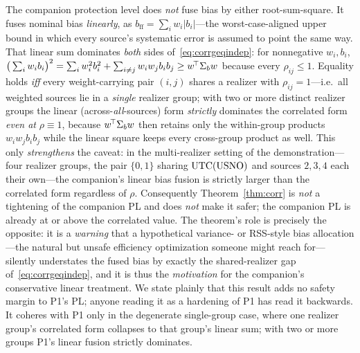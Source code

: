 \begin{remark}
\label{rem:i3}
The companion protection level \citep{baweja2026cti} does \emph{not} fuse bias by
either root-sum-square. It fuses nominal bias \emph{linearly}, as
$b_{\mathrm{ff}}=\sum_i w_i|b_i|$---the worst-case-aligned upper bound in which
every source's systematic error is assumed to point the same way. That linear sum
dominates \emph{both} sides of~\eqref{eq:corrgeqindep}: for nonnegative $w_i,b_i$,
$\big(\sum_i w_i b_i\big)^2=\sum_i w_i^2 b_i^2+\sum_{i\neq j} w_i w_j b_i b_j \ge
w^{\!\top}\Sigma_{b}{}w$ because every $\rho_{ij}\le1$. Equality holds \emph{iff} every
weight-carrying pair $(i,j)$ shares a realizer with $\rho_{ij}=1$---i.e.\ all
weighted sources lie in a \emph{single} realizer group; with two or more distinct
realizer groups the linear (across-\emph{all}-sources) form \emph{strictly}
dominates the correlated form \emph{even at} $\rho\equiv1$, because $w^{\!\top}\Sigma_{b}{}w$
then retains only the within-group products $w_iw_jb_ib_j$ while the linear square
keeps every cross-group product as well. This only \emph{strengthens} the caveat:
in the multi-realizer setting of the demonstration---four realizer groups, the pair
$\{0,1\}$ sharing $\mathrm{UTC}{}(\mathrm{USNO})$ and sources $2,3,4$ each their own---the
companion's linear bias fusion is strictly larger than the correlated form
regardless of $\rho$. Consequently
Theorem~\ref{thm:corr} is \emph{not} a tightening of the companion PL and does
\emph{not} make it safer; the companion PL is already at or above the correlated
value. The theorem's role is precisely the opposite: it is a \emph{warning} that a
hypothetical variance- or RSS-style bias allocation---the natural but unsafe
efficiency optimization someone might reach for---silently understates the fused
bias by exactly the shared-realizer gap of~\eqref{eq:corrgeqindep}, and it is thus
the \emph{motivation} for the companion's conservative linear treatment. We state
plainly that this result adds no safety margin to P1's PL; anyone reading it as a
hardening of P1 has read it backwards. It coheres with P1 only in the degenerate
single-group case, where one realizer group's correlated form collapses to that
group's linear sum; with two or more groups P1's linear fusion strictly dominates.
\end{remark}
